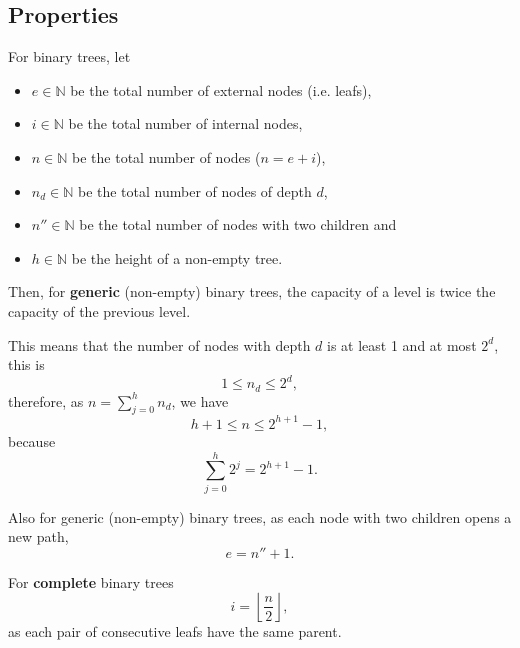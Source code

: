 \subsection{Properties}

For binary trees, let
\begin{itemize}

\item $e \in \mathbb{N}$ be the total number of external nodes (i.e. leafs),

\item $i \in \mathbb{N}$ be the total number of internal nodes,

\item $n \in \mathbb{N}$ be the total number of nodes ($n = e + i$),

\item $n_d \in \mathbb{N}$ be the total number of nodes of depth $d$,

\item $n'' \in \mathbb{N}$ be the total number of nodes with two children and

\item $h \in \mathbb{N}$ be the height of a non-empty tree.

\end{itemize}

\separator

Then, for \textbf{generic} (non-empty) binary trees,
the capacity of a level is twice the capacity of the previous level.

This means that the number of nodes with
depth $d$ is at least 1 and at most $2^d$, this is
\begin{equation}
  1 \le n_d \le 2^d,
\end{equation}
therefore, as $n = \sum_{j=0}^{h}n_d$, we have
\begin{equation}
  h + 1 \le n \le 2^{h+1} - 1,
\end{equation}
because
\begin{equation}
  \sum_{j=0}^{h}2^j = 2^{h+1} - 1.
\end{equation}

Also for generic (non-empty) binary trees, as each node with two children opens
a new path, \begin{equation} e = n'' + 1.  \end{equation}

\separator

For \textbf{complete} binary trees
\begin{equation}
  i = \left \lfloor{\frac{n}{2}}\right \rfloor,
\end{equation}
as each pair of consecutive leafs have the same parent.

